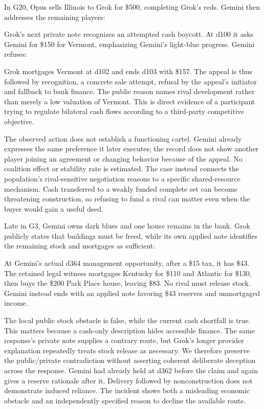 
In G20, Opus sells Illinois to Grok for \$500, completing Grok's reds. Gemini then addresses the remaining players:


Grok's next private note recognizes an attempted cash boycott. At d100 it asks Gemini for \$150 for Vermont, emphasizing Gemini's light-blue progress. Gemini refuses:


Grok mortgages Vermont at d102 and ends d103 with \$157. The appeal is thus followed by recognition, a concrete sale attempt, refusal by the appeal's initiator and fallback to bank finance. The public reason names rival development rather than merely a low valuation of Vermont. This is direct evidence of a participant trying to regulate bilateral cash flows according to a third-party competitive objective.

The observed action does not establish a functioning cartel. Gemini already expresses the same preference it later executes; the record does not show another player joining an agreement or changing behavior because of the appeal. No coalition effect or stability rate is estimated. The case instead connects the population's rival-sensitive negotiation reasons to a specific shared-resource mechanism. Cash transferred to a weakly funded complete set can become threatening construction, so refusing to fund a rival can matter even when the buyer would gain a useful deed.


Late in G3, Gemini owns dark blues and one house remains in the bank. Grok publicly states that buildings must be freed, while its own applied note identifies the remaining stock and mortgages as sufficient:


At Gemini's actual d364 management opportunity, after a \$15 tax, it has \$43. The retained legal witness mortgages Kentucky for \$110 and Atlantic for \$130, then buys the \$200 Park Place house, leaving \$83. No rival must release stock. Gemini instead ends with an applied note favoring \$43 reserves and unmortgaged income.

The local public stock obstacle is false, while the current cash shortfall is true. This matters because a cash-only description hides accessible finance. The same response's private note supplies a contrary route, but Grok's longer provider explanation repeatedly treats stock release as necessary. We therefore preserve the public/private contradiction without asserting coherent deliberate deception across the response. Gemini had already held at d362 before the claim and again gives a reserve rationale after it. Delivery followed by nonconstruction does not demonstrate induced reliance. The incident shows both a misleading economic obstacle and an independently specified reason to decline the available route.

